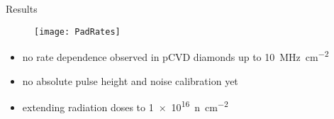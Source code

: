 \begin{frame}{Results}

	\vspace*{-5pt}
	\begin{figure}[h]
		\begin{center}
			\texttt{[image: PadRates]}
		\end{center}
	\end{figure}

	\begin{itemize}
		\item no rate dependence observed in pCVD diamonds up to \SI{10}{\mega\hertz\per cm^2}
		\item no absolute pulse height and noise calibration yet
		\item extending radiation doses to \SI{1e16}{n\per cm^2}
	\end{itemize}
\end{frame}

